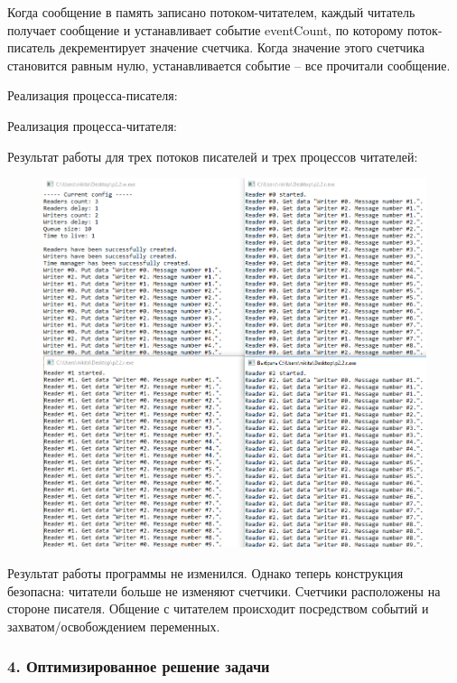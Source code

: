 \documentclass[14pt,a4paper,report]{report}
\begin{document}
Когда сообщение в память записано потоком-читателем, каждый читатель получает сообщение и устанавливает событие eventCount, по которому поток-писатель декрементирует значение счетчика. Когда значение этого счетчика становится равным нулю, устанавливается событие – все прочитали сообщение.

Реализация процесса-писателя:



Реализация процесса-читателя:



\clearpage

Результат работы для трех потоков писателей и трех процессов читателей:

\begin{figure}[h!]
	\centering
	\includegraphics[scale = 0.74]{images/p2_3.png}
	
	\caption{}
	\label{image:15}
\end{figure}

Результат работы программы не изменился.  Однако теперь конструкция безопасна: читатели больше не изменяют счетчики. Счетчики расположены на стороне писателя. Общение с читателем происходит посредством событий и захватом/освобождением переменных.

\subsubsection{4. Оптимизированное решение задачи}
\end{document}
